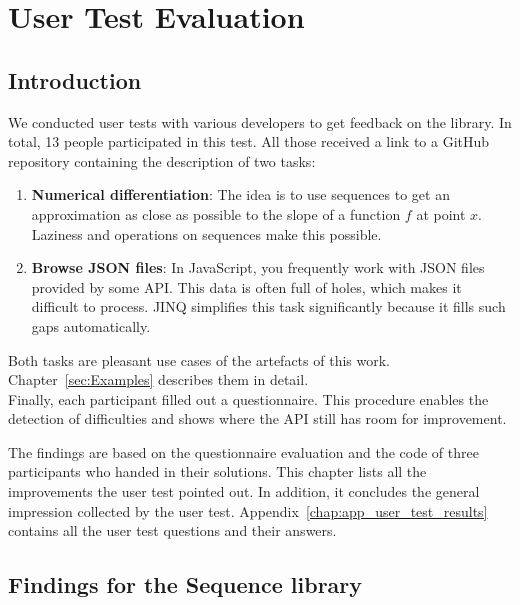\section{User Test Evaluation} %
\label{sec:User Test Evaluation}
\subsection{Introduction} %
\label{sub:Introduction}
We conducted user tests with various developers to get feedback on the library.
In total, 13 people participated in this test. All those received a link to a
GitHub repository containing the description of two tasks:
\begin{enumerate}
\item \textbf{Numerical differentiation}: The idea is to use sequences to get
  an approximation as close as possible to the slope of a function $f$ at point
  $x$. Laziness and operations on sequences make this possible.
\item \textbf{Browse JSON files}: In JavaScript, you frequently work with JSON
  files provided by some API. This data is often full of holes, which makes it
  difficult to process. JINQ simplifies this task significantly because it
  fills such gaps automatically. 
\end{enumerate}
Both tasks are pleasant use cases of the artefacts of this work.
Chapter~\ref{sec:Examples} describes them in detail.\\
Finally, each participant filled out a questionnaire. This procedure enables
the detection of difficulties and shows where the API still has room for
improvement. 

The findings are based on the questionnaire evaluation and the code of three
participants who handed in their solutions. This chapter lists all the
improvements the user test pointed out. In addition, it concludes the general
impression collected by the user test.
Appendix~\ref{chap:app_user_test_results} contains all the user test questions
and their answers.

\subsection{Findings for the Sequence library} %
\label{sub:Findings for the sequence library}

